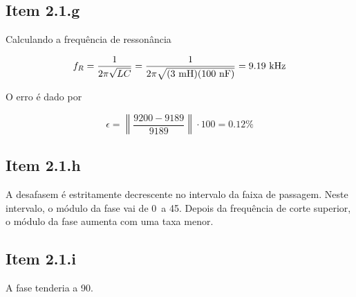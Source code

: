 \documentclass[11pt]{article}
\begin{document}
\subsection*{Item 2.1.g}

Calculando a frequência de ressonância

$$
  f_{R} = \frac{1}{2\pi \sqrt{LC}} = \frac{1}{2\pi \sqrt{(3\ \textnormal{mH})(100\ \textnormal{nF})}} = 9.19\ \textnormal{kHz}
$$

O erro é dado por

$$
  \epsilon = \left\|\frac{9200 - 9189}{9189}\right\| \cdot 100 = 0.12\%
$$

\subsection*{Item 2.1.h}

A desafasem é estritamente decrescente no intervalo da faixa de passagem. Neste intervalo, o módulo da fase vai de 0\textdegree\ a 45\textdegree . Depois da frequência de corte superior, o módulo da fase aumenta com uma taxa menor.

\subsection*{Item 2.1.i}

A fase tenderia a 90\textdegree.
\end{document}
